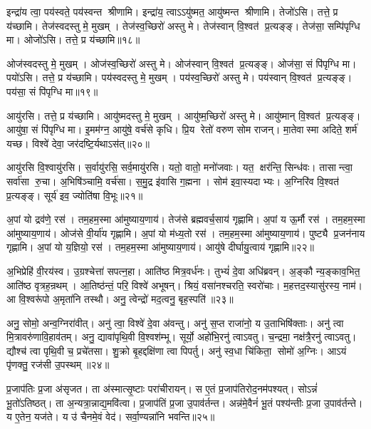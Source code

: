 इन्द्रा॑य त्वा॒ पय॑स्वते॒ पय॑स्वन्त श्रीणामि।
इन्द्रा॑य॒ त्वाऽऽयु॑ष्मत॒ आयु॑ष्मन्त श्रीणामि।
तेजो॑ऽसि।
तत्ते॒ प्र य॑च्छामि।
तेज॑स्वदस्तु मे॒ मुखम्।
तेज॑स्व॒च्छिरो॑ अस्तु मे।
तेज॑स्वान् वि॒श्वत॑ प्र॒त्यङ्ङ्।
तेज॑सा॒ सम्पि॑पृग्धि मा।
ओजो॑ऽसि।
तत्ते॒ प्र य॑च्छामि॥१८॥

ओज॑स्वदस्तु मे॒ मुखम्।
ओज॑स्व॒च्छिरो॑ अस्तु मे।
ओज॑स्वान् वि॒श्वत॑ प्र॒त्यङ्ङ्।
ओज॑सा॒ सं पि॑पृग्धि मा।
पयो॑ऽसि।
तत्ते॒ प्र य॑च्छामि।
पय॑स्वदस्तु मे॒ मुखम्।
पय॑स्व॒च्छिरो॑ अस्तु मे।
पय॑स्वान् वि॒श्वत॑ प्र॒त्यङ्ङ्।
पय॑सा॒ सं पि॑पृग्धि मा॥१९॥

आयु॑रसि।
तत्ते॒ प्र य॑च्छामि।
आयु॑ष्मदस्तु मे॒ मुखम्।
आयु॑ष्म॒च्छिरो॑ अस्तु मे।
आयु॑ष्मान् वि॒श्वत॑ प्र॒त्यङ्ङ्।
आयु॑षा॒ सं पि॑पृग्धि मा।
इ॒मम॑ग्न॒ आयु॑षे॒ वर्च॑से कृधि।
प्रि॒य रेतो॑ वरुण सोम राजन्।
मा॒तेवास्मा अदिते॒ शर्म॑ यच्छ।
विश्वे॑ देवा॒ जर॑दष्टि॒र्यथाऽस॑त्॥२०॥

आयु॑रसि वि॒श्वायु॑रसि।
स॒र्वायु॑रसि॒ सर्व॒मायु॑रसि।
यतो॒ वातो॒ मनो॑जवाः।
यत॒ क्षर॑न्ति॒ सिन्ध॑वः।
तासान्त्वा॒ सर्वा॑सा रु॒चा।
अ॒भिषि॑ञ्चामि॒ वर्च॑सा।
स॒मु॒द्र इ॑वासि ग॒ह्मना।
सोम॑ इवा॒स्यदाभ्यः।
अ॒ग्निरि॑व वि॒श्वत॑ प्र॒त्यङ्ङ्।
सूर्य॑ इव॒ ज्योति॑षा वि॒भूः॥२१॥

अ॒पां यो द्रव॑णे॒ रस॑।
तम॒हम॒स्मा आ॑मुष्याय॒णाय॑।
तेज॑से ब्रह्मवर्च॒साय॑ गृह्णामि।
अ॒पां य ऊ॒र्मौ रस॑।
तम॒हम॒स्मा आ॑मुष्याय॒णाय॑।
ओज॑से वी॒र्या॑य गृह्णामि।
अ॒पां यो म॑ध्य॒तो रस॑।
तम॒हम॒स्मा आ॑मुष्याय॒णाय॑।
पुष्ट्यै प्र॒जन॑नाय गृह्णामि।
अ॒पां यो य॒ज्ञियो॒ रस॑।
तम॒हम॒स्मा आ॑मुष्याय॒णाय॑।
आयु॑षे दीर्घायु॒त्वाय॑ गृह्णामि॥२२॥\anuvakamend[गोष्वोज॑स्वन्त श्रीणा॒म्योजो॑ऽसि॒ तत्ते॒ प्रय॑च्छामि॒ पय॑सा॒ सम्पि॑पृग्धि॒ माऽस॑द्वि॒भूर्य॒ज्ञियो॒ रसो॒ द्वे च॑]

अ॒भिप्रेहि॑ वी॒रय॑स्व।
उ॒ग्रश्चेत्ता॑ सपत्न॒हा।
आति॑ष्ठ मित्र॒वर्ध॑नः।
तुभ्यं॑ दे॒वा अधि॑ब्रवन्।
अ॒ङ्कौ न्य॒ङ्काव॒भित॒ आति॑ष्ठ वृत्रह॒न्रथम्।
आ॒तिष्ठ॑न्तं॒ परि॒ विश्वे॑ अभूषन्।
श्रियं॒ वसा॑नश्चरति॒ स्वरो॑चाः।
म॒हत्तद॒स्यासु॑रस्य॒ नाम॑।
आ वि॒श्वरू॑पो अ॒मृता॑नि तस्थौ।
अनु॒ त्वेन्द्रो॑ मद॒त्वनु॒ बृह॒स्पति॑॥२३॥

अनु॒ सोमो॒ अन्व॒ग्निरा॑वीत्।
अनु॑ त्वा॒ विश्वे॑ दे॒वा अ॑वन्तु।
अनु॑ स॒प्त राजा॑नो॒ य उ॒ताभिषि॑क्ताः।
अनु॑ त्वा मि॒त्रावरु॑णावि॒हाव॑तम्।
अनु॒ द्यावा॑पृथि॒वी वि॒श्वश॑म्भू।
सूर्यो॒ अहो॑भि॒रनु॑ त्वाऽवतु।
च॒न्द्रमा॒ नक्ष॑त्रै॒रनु॑ त्वाऽवतु।
द्यौश्च॑ त्वा पृथि॒वी च॒ प्रचे॑तसा।
शु॒क्रो बृ॒हद्दक्षि॑णा त्वा पिपर्तु।
अनु॑ स्व॒धा चि॑किता॒ सोमो॑ अ॒ग्निः।
आऽयं पृ॑णक्तु॒ रज॑सी उ॒पस्थम्॥२४॥\anuvakamend[बृह॒स्पति॒ सोमो॑ अ॒ग्निरेकं च]

प्र॒जाप॑तिः प्र॒जा अ॑सृजत।
ता अ॑स्मात्सृ॒ष्टाः परा॑चीरायन्।
स ए॒तं प्र॒जाप॑तिरोद॒नम॑पश्यत्।
सोऽन्नं॑ भू॒तो॑ऽतिष्ठत्।
ता अ॒न्यत्रा॒न्नाद्य॒मवि॑त्वा।
प्र॒जाप॑तिं प्र॒जा उ॒पाव॑र्तन्त।
अन्न॑मे॒वैनं॑ भू॒तं पश्य॑न्तीः प्र॒जा उ॒पाव॑र्तन्ते।
य ए॒तेन॒ यज॑ते।
य उ॑ चैनमे॒वं वेद॑।
सर्वा॒ण्यन्ना॑नि भवन्ति॥२५॥


